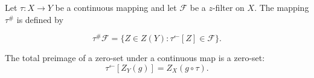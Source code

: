 Let \(\tau : X \to Y\) be a continuous mapping and let \(\mathcal{F}\) be a \(z\)-filter on \(X\). The mapping \(\tau^\#\) is defined by

\[
\tau^\#\mathcal{F} = \{ Z \in Z(Y) : \tau^{\leftarrow}[Z] \in \mathcal{F} \}.
\]

The total preimage of a zero-set under a continuous map is a zero-set:
\[
\tau^{\leftarrow}[Z_Y(g)] = Z_X(g \circ \tau).
\]

